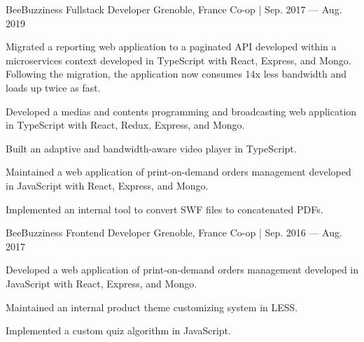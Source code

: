 \begin{cventries}
    \cventry
    {BeeBuzziness} %
    {Fullstack Developer} %
    {Grenoble, France} %
    {Co-op | Sep. 2017 — Aug. 2019} %
    {
    \begin{cvitems} %
        \item {Migrated a reporting web application to a paginated API developed within a microservices context developed in TypeScript with React, Express, and Mongo.
        Following the migration, the application now consumes 14x less bandwidth and loads up twice as fast.}
        \item {Developed a medias and contents programming and broadcasting web application in TypeScript with React, Redux, Express, and Mongo.}
        \item {Built an adaptive and bandwidth-aware video player in TypeScript.}
        \item {Maintained a web application of print-on-demand orders management developed in JavaScript with React, Express, and Mongo.}
        \item {Implemented an internal tool to convert SWF files to concatenated PDFs.}
    \end{cvitems}
    }

    \cventry
    {BeeBuzziness} %
    {Frontend Developer} %
    {Grenoble, France} %
    {Co-op | Sep. 2016 — Aug. 2017} %
    {
    \begin{cvitems} %
        \item {Developed a web application of print-on-demand orders management developed in JavaScript with React, Express, and Mongo.}
        \item {Maintained an internal product theme customizing system in LESS.}
        \item {Implemented a custom quiz algorithm in JavaScript.}
    \end{cvitems}
    }

\end{cventries}
